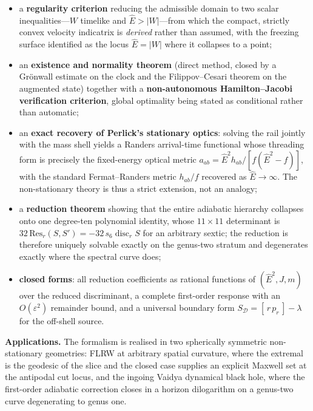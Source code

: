\documentclass[11pt]{article}
\begin{document}
\begin{itemize}\itemsep2pt
\item a \textbf{regularity criterion} reducing the admissible domain to two scalar
inequalities---$W$ timelike and $\hat E>|W|$---from which the compact, strictly convex
velocity indicatrix is \emph{derived} rather than assumed, with the freezing surface
identified as the locus $\hat E=|W|$ where it collapses to a point;
\item an \textbf{existence and normality theorem} (direct method, closed by a Gr\"onwall
estimate on the clock and the Filippov--Cesari theorem on the augmented state) together
with a \textbf{non-autonomous Hamilton--Jacobi verification criterion}, global optimality
being stated as conditional rather than automatic;
\item an \textbf{exact recovery of Perlick's stationary optics}: solving the rail jointly
with the mass shell yields a Randers arrival-time functional whose threading form is
precisely the fixed-energy optical metric $a_{ab}=\hat E^2h_{ab}/[f(\hat E^2-f)]$, with the
standard Fermat--Randers metric $h_{ab}/f$ recovered as $\hat E\to\infty$. The
non-stationary theory is thus a strict extension, not an analogy;
\item a \textbf{reduction theorem} showing that the entire adiabatic hierarchy collapses
onto one degree-ten polynomial identity, whose $11\times11$ determinant is
$32\,\mathrm{Res}_r(S,S')=-32\,s_6\operatorname{disc}_rS$ for an arbitrary sextic; the
reduction is therefore uniquely solvable exactly on the genus-two stratum and degenerates
exactly where the spectral curve does;
\item \textbf{closed forms}: all reduction coefficients as rational functions of
$(\hat E^2,J,m)$ over the reduced discriminant, a complete first-order response with an
$O(\varepsilon^2)$ remainder bound, and a universal boundary form
$S_{\mathcal D}=[\,r\,p_r\,]-\lambda$ for the off-shell source.
\end{itemize}

\vspace{0.3em}
\noindent\textbf{Applications.} The formalism is realised in two spherically symmetric
non-stationary geometries: FLRW at arbitrary spatial curvature, where the extremal is the
geodesic of the slice and the closed case supplies an explicit Maxwell set at the
antipodal cut locus, and the ingoing Vaidya dynamical black hole, where the first-order
adiabatic correction closes in a horizon dilogarithm on a genus-two curve degenerating to
genus one.
\end{document}
